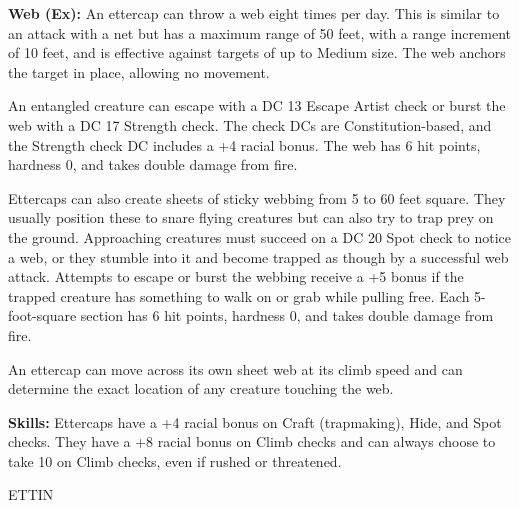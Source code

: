 \documentclass{article}
\begin{document}
\textbf{Web (Ex):} An ettercap can throw a web eight times per day. This is similar 
to an attack with a net but has a maximum range of 50 feet, with a range increment 
of 10 feet, and is effective against targets of up to Medium size. The web anchors 
the target in place, allowing no movement.

An entangled creature can escape with a DC 13 Escape Artist check or burst the 
web with a DC 17 Strength check. The check DCs are Constitution-based, and the 
Strength check DC includes a +4 racial bonus. The web has 6 hit points, hardness 
0, and takes double damage from fire.

Ettercaps can also create sheets of sticky webbing from 5 to 60 feet square. They 
usually position these to snare flying creatures but can also try to trap prey 
on the ground. Approaching creatures must succeed on a DC 20 Spot check to notice 
a web, or they stumble into it and become trapped as though by a successful web 
attack. Attempts to escape or burst the webbing receive a +5 bonus if the trapped 
creature has something to walk on or grab while pulling free. Each 5-foot-square 
section has 6 hit points, hardness 0, and takes double damage from fire.

An ettercap can move across its own sheet web at its climb speed and can determine 
the exact location of any creature touching the web.

\textbf{Skills:} Ettercaps have a +4 racial bonus on Craft (trapmaking), Hide, 
and Spot checks. They have a +8 racial bonus on Climb checks and can always choose 
to take 10 on Climb checks, even if rushed or threatened.

\vspace{12pt}
{\LARGE{}ETTIN}
\end{document}
